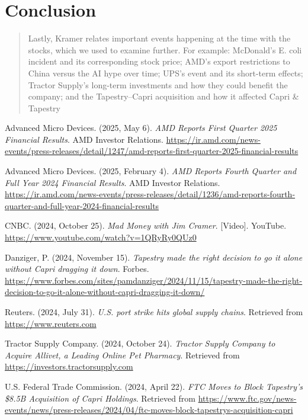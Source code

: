 \documentclass[12pt,a4paper]{article}
\begin{document}
\section*{Conclusion}

\begin{quote}
Lastly, Kramer relates important events happening at the time with the stocks, which we used to examine further. For example: McDonald’s E. coli incident and its corresponding stock price; AMD’s export restrictions to China versus the AI hype over time; UPS’s event and its short-term effects; Tractor Supply’s long-term investments and how they could benefit the company; and the Tapestry–Capri acquisition and how it affected Capri \& Tapestry
\end{quote}


\begin{thebibliography}{9}
 Advanced Micro Devices. (2025, May 6).  
\textit{AMD Reports First Quarter 2025 Financial Results}. AMD Investor Relations.  
\url{https://ir.amd.com/news-events/press-releases/detail/1247/amd-reports-first-quarter-2025-financial-results}

 Advanced Micro Devices. (2025, February 4).  
\textit{AMD Reports Fourth Quarter and Full Year 2024 Financial Results}. AMD Investor Relations.  
\url{https://ir.amd.com/news-events/press-releases/detail/1236/amd-reports-fourth-quarter-and-full-year-2024-financial-results}

 CNBC. (2024, October 25).  
\textit{Mad Money with Jim Cramer}. [Video]. YouTube.  
\url{https://www.youtube.com/watch?v=1QRyRy0QUz0}

 Danziger, P. (2024, November 15).  
\textit{Tapestry made the right decision to go it alone without Capri dragging it down}. Forbes.  
\url{https://www.forbes.com/sites/pamdanziger/2024/11/15/tapestry-made-the-right-decision-to-go-it-alone-without-capri-dragging-it-down/}

 Reuters. (2024, July 31).  
\textit{U.S. port strike hits global supply chains}.  
Retrieved from \url{https://www.reuters.com}

 Tractor Supply Company. (2024, October 24).  
\textit{Tractor Supply Company to Acquire Allivet, a Leading Online Pet Pharmacy}.  
Retrieved from \url{https://investors.tractorsupply.com}

 U.S. Federal Trade Commission. (2024, April 22).  
\textit{FTC Moves to Block Tapestry’s \$8.5B Acquisition of Capri Holdings}.  
Retrieved from \url{https://www.ftc.gov/news-events/news/press-releases/2024/04/ftc-moves-block-tapestrys-acquisition-capri}


\end{thebibliography}
\end{document}
